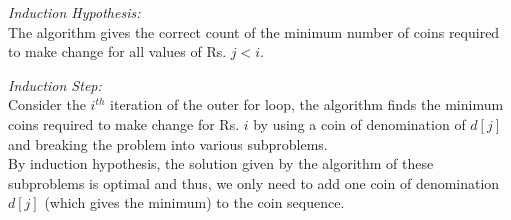 \documentclass[a4paper]{article}
\begin{document}
\begin{enumerate}[1.]
    \textit{Induction Hypothesis:}\\ The algorithm gives the correct count of the minimum number of coins required to make change for all values of Rs. $j < i$.
    
    \textit{Induction Step:}\\ 
    Consider the $i^{th}$ iteration of the outer for loop, the algorithm finds the minimum coins required to make change for Rs. $i$ by using a coin of denomination of $d[j]$ and breaking the problem into various subproblems.\\
    By induction hypothesis, the solution given by the algorithm of these subproblems is optimal and thus, we only need to add one coin of denomination $d[j]$ (which gives the minimum) to the coin sequence.
    
    \hfill\qedsymbol
    
    
\end{enumerate}
\end{document}
